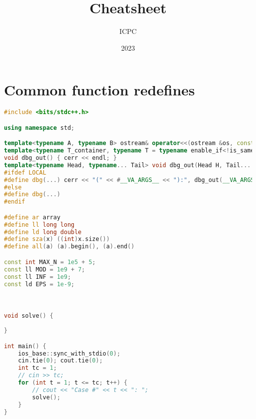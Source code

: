 \documentclass{article}
\title{Cheatsheet}
\date{2023}
\author{ICPC}
\begin{document}
\maketitle
\section{Common function redefines}
\lstset {    language=C++,
    basicstyle=\small\ttfamily,
    numbers=left,
    breaklines=true,
    tabsize=4}
\begin{lstlisting}[linewidth=\columnwidth,breaklines=true,language=C++]
#include <bits/stdc++.h>

using namespace std;

template<typename A, typename B> ostream& operator<<(ostream &os, const pair<A, B> &p) { return os << '(' << p.first << ", " << p.second << ')'; }
template<typename T_container, typename T = typename enable_if<!is_same<T_container, string>::value, typename T_container::value_type>::type> ostream& operator<<(ostream &os, const T_container &v) { os << '{'; string sep; for (const T &x : v) os << sep << x, sep = ", "; return os << '}'; }
void dbg_out() { cerr << endl; }
template<typename Head, typename... Tail> void dbg_out(Head H, Tail... T) { cerr << ' ' << H; dbg_out(T...); }
#ifdef LOCAL
#define dbg(...) cerr << "(" << #__VA_ARGS__ << "):", dbg_out(__VA_ARGS__)
#else
#define dbg(...)
#endif

#define ar array
#define ll long long
#define ld long double
#define sza(x) ((int)x.size())
#define all(a) (a).begin(), (a).end()

const int MAX_N = 1e5 + 5;
const ll MOD = 1e9 + 7;
const ll INF = 1e9;
const ld EPS = 1e-9;



void solve() {
    
}

int main() {
    ios_base::sync_with_stdio(0);
    cin.tie(0); cout.tie(0);
    int tc = 1;
    // cin >> tc;
    for (int t = 1; t <= tc; t++) {
        // cout << "Case #" << t << ": ";
        solve();
    }
}
\end{lstlisting}
\end{document}
